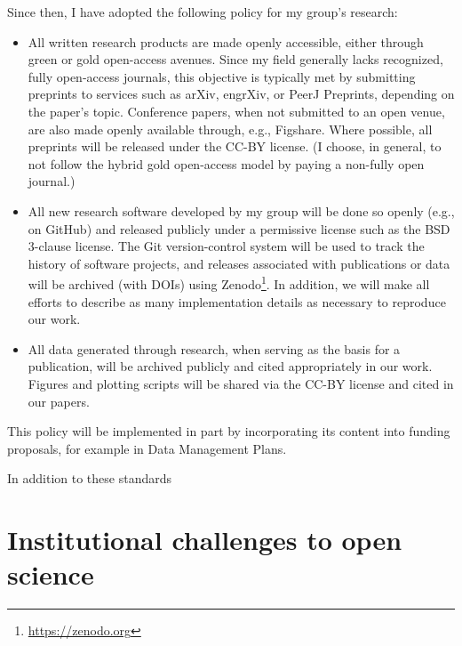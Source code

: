 \documentclass[nobib]{tufte-handout}
\begin{document}
Since then, I have adopted the following policy for my group's research:
\begin{itemize}
    \item All written research products are made openly accessible, either through
    green or gold open-access avenues. Since my field generally lacks recognized,
    fully open-access journals, this objective is typically met by submitting
    preprints to services such as arXiv, engrXiv, or PeerJ Preprints, depending
    on the paper's topic. Conference papers, when not submitted to an open venue,
    are also made openly available through, e.g., Figshare. Where possible, all
    preprints will be released under the CC-BY license.
    (I choose, in general, to not follow the hybrid gold open-access model by
    paying a non-fully open journal.)

    \item All new research software developed by my group will be done so openly
    (e.g., on GitHub) and released publicly under a permissive license such as
    the BSD 3-clause license. The Git version-control system will be used to
    track the history of software projects, and releases associated with
    publications or data will be archived (with DOIs) using
    Zenodo\footnote{\url{https://zenodo.org}}.
    In addition, we will make all efforts to describe as many implementation
    details as necessary to reproduce our work.

    \item All data generated through research, when serving as the basis for
    a publication, will be archived publicly and cited appropriately in our
    work. Figures and plotting scripts will be shared via the CC-BY license
    and cited in our papers.
\end{itemize}
This policy will be implemented in part by incorporating its content into
funding proposals, for example in Data Management Plans.

In addition to these standards


\section{Institutional challenges to open science}


%
%
\printbibliography
\end{document}
